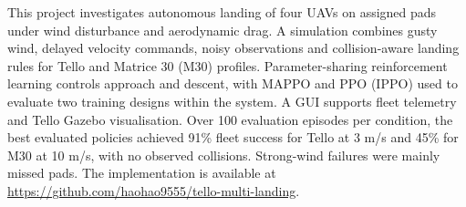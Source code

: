 This project investigates autonomous landing of four UAVs on assigned pads under wind disturbance and aerodynamic drag. A simulation combines gusty wind, delayed velocity commands, noisy observations and collision-aware landing rules for Tello and Matrice 30 (M30) profiles. Parameter-sharing reinforcement learning controls approach and descent, with MAPPO and PPO (IPPO) used to evaluate two training designs within the system. A GUI supports fleet telemetry and Tello Gazebo visualisation. Over 100 evaluation episodes per condition, the best evaluated policies achieved 91\% fleet success for Tello at 3 m/s and 45\% for M30 at 10 m/s, with no observed collisions. Strong-wind failures were mainly missed pads. The implementation is available at \url{https://github.com/haohao9555/tello-multi-landing}.
